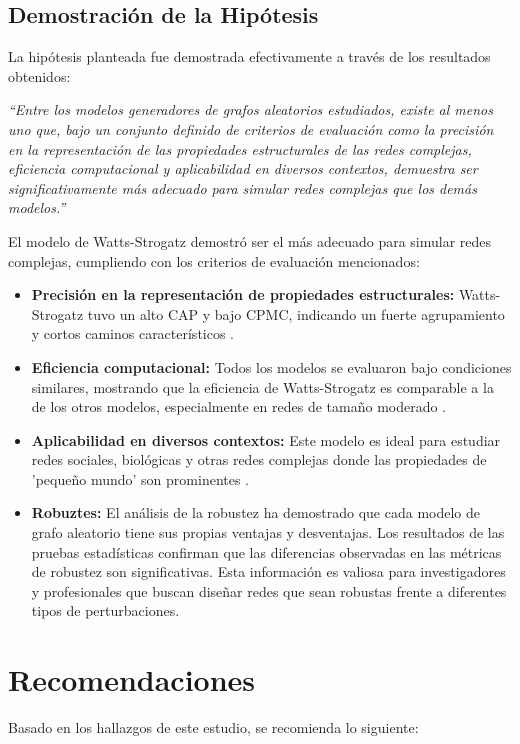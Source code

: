\subsection{Demostración de la Hipótesis}

La hipótesis planteada fue demostrada efectivamente a través de los resultados obtenidos:

\textit{``Entre los modelos generadores de grafos aleatorios estudiados, existe al menos uno que, bajo un conjunto definido de criterios de evaluación como la precisión en la representación de las propiedades estructurales de las redes complejas, eficiencia computacional y aplicabilidad en diversos contextos, demuestra ser significativamente más adecuado para simular redes complejas que los demás modelos.''}

El modelo de Watts-Strogatz demostró ser el más adecuado para simular redes complejas, cumpliendo con los criterios de evaluación mencionados:
\begin{itemize}
    \item \textbf{Precisión en la representación de propiedades estructurales:} Watts-Strogatz tuvo un alto CAP y bajo CPMC, indicando un fuerte agrupamiento y cortos caminos característicos .
    \item \textbf{Eficiencia computacional:} Todos los modelos se evaluaron bajo condiciones similares, mostrando que la eficiencia de Watts-Strogatz es comparable a la de los otros modelos, especialmente en redes de tamaño moderado .
    \item \textbf{Aplicabilidad en diversos contextos:} Este modelo es ideal para estudiar redes sociales, biológicas y otras redes complejas donde las propiedades de 'pequeño mundo' son prominentes .
    \item \textbf{Robuztes:} El análisis de la robustez ha demostrado que cada modelo de grafo aleatorio tiene sus propias ventajas y desventajas. Los resultados de las pruebas estadísticas confirman que las diferencias observadas en las métricas de robustez son significativas. Esta información es valiosa para investigadores y profesionales que buscan diseñar redes que sean robustas frente a diferentes tipos de perturbaciones.
\end{itemize}

\section{Recomendaciones}

Basado en los hallazgos de este estudio, se recomienda lo siguiente:

